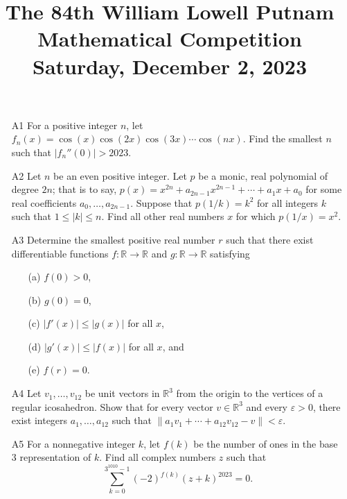 \documentclass[amssymb,twocolumn,pra,10pt,aps,nofootinbib]{revtex4-1}
\begin{document}
\title{The 84th William Lowell Putnam Mathematical Competition \\
    Saturday, December 2, 2023}
\maketitle

\begin{itemize}

\item[A1] For a positive integer $n$, let $f_n(x) = \cos(x) \cos(2x) \cos(3x) \cdots \cos(nx)$. Find the smallest $n$ such that $|f_n''(0)| > 2023$.

\item[A2] Let $n$ be an even positive integer. Let $p$ be a monic, real polynomial of degree $2n$; that is to say, $p(x) = x^{2n} + a_{2n-1} x^{2n-1} + \cdots + a_1 x + a_0$ for some real coefficients $a_0, \dots, a_{2n-1}$. Suppose that $p(1/k) = k^2$ for all integers $k$ such that $1 \leq |k| \leq n$. Find all other real numbers $x$ for which $p(1/x) = x^2$.

\item[A3] Determine the smallest positive real number $r$ such that there exist differentiable functions $f\colon \mathbb{R} \to \mathbb{R}$ and $g\colon \mathbb{R} \to \mathbb{R}$ satisfying 
\begin{enumerate}


\item[(a)] $f(0) > 0$,

\item[(b)] $g(0) = 0$,

\item[(c)] $|f'(x)| \leq |g(x)|$ for all $x$,

\item[(d)] $|g'(x)| \leq |f(x)|$ for all $x$, and

\item[(e)] $f(r) = 0$. 
\end{enumerate}


\item[A4] Let $v_1, \dots, v_{12}$ be unit vectors in $\mathbb{R}^3$ from the origin to the vertices of a regular icosahedron. Show that for every vector $v \in \mathbb{R}^3$ and every $\varepsilon > 0$, there exist integers $a_1,\dots,a_{12}$ such that $\| a_1 v_1 + \cdots + a_{12} v_{12} - v \| < \varepsilon$.

\item[A5] For a nonnegative integer $k$, let $f(k)$ be the number of ones in the base 3 representation of $k$. Find all complex numbers $z$ such that \[ \sum_{k=0}^{3^{1010}-1} (-2)^{f(k)} (z+k)^{2023} = 0. \]


\end{itemize}
\end{document}
